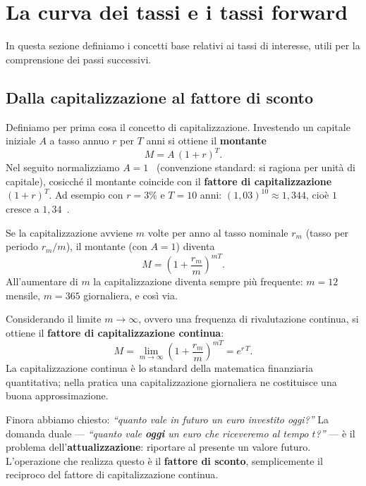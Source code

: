 \documentclass[11pt,a4paper]{article}
\theoremstyle{plain}
\theoremstyle{definition}
\theoremstyle{remark}
\begin{document}
\section{La curva dei tassi e i tassi forward}

In questa sezione definiamo i concetti base relativi ai tassi di interesse, utili per la comprensione dei passi successivi.

\subsection{Dalla capitalizzazione al fattore di sconto}

Definiamo per prima cosa il concetto di capitalizzazione.
Investendo un capitale iniziale $A$ a tasso annuo $r$ per $T$ anni si ottiene il
\textbf{montante}
\begin{equation}
  M = A\,(1+r)^T.
  \label{eq:montante}
\end{equation}
Nel seguito normalizziamo $A = 1$~\texteuro{} (convenzione standard: si ragiona per
unit\`a di capitale), cosicch\'e il montante coincide con il \textbf{fattore di
capitalizzazione} $(1+r)^T$. Ad esempio con $r=3\%$ e $T=10$ anni:
$(1{,}03)^{10} \approx 1{,}344$, cio\`e $1$~\texteuro{} cresce a $1{,}34$~\texteuro{}.

Se la capitalizzazione avviene $m$ volte per anno al tasso nominale $r_m$ (tasso per
periodo $r_m/m$), il montante (con $A=1$) diventa
\[
  M = \left(1 + \frac{r_m}{m}\right)^{mT}.
\]
All'aumentare di $m$ la capitalizzazione diventa sempre pi\`u frequente: $m=12$ mensile,
$m=365$ giornaliera, e cos\`i via.

Considerando il limite ${m\to\infty}$, ovvero una frequenza di rivalutazione continua, si
ottiene il \textbf{fattore di capitalizzazione continua}:
\begin{equation}
  M = \lim_{m\to\infty}\left(1+\frac{r_m}{m}\right)^{mT} = e^{r\,T}.
  \label{eq:cap-cont}
\end{equation}
La capitalizzazione continua \`e lo standard della matematica finanziaria quantitativa; nella
pratica una capitalizzazione giornaliera ne costituisce una buona approssimazione.

Finora abbiamo chiesto: \emph{``quanto vale in futuro un euro investito oggi?''}
La domanda duale --- \emph{``quanto vale \textbf{oggi} un euro che riceveremo al tempo $t$?''} ---
\`e il problema dell'\textbf{attualizzazione}: riportare al presente un valore futuro.
L'operazione che realizza questo \`e il \textbf{fattore di sconto}, semplicemente il reciproco
del fattore di capitalizzazione continua.
\end{document}
